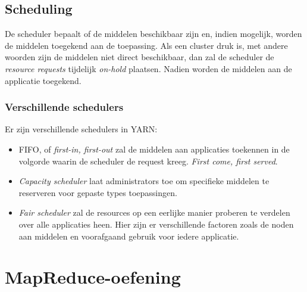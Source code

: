 \documentclass[a4paper,10pt,twoside]{report}
\begin{document}
\subsection{Scheduling}

De scheduler bepaalt of de middelen beschikbaar zijn en, indien mogelijk, worden de middelen toegekend aan de toepassing. Als een cluster druk is, met andere woorden zijn de middelen niet direct beschikbaar, dan zal de scheduler de \textit{resource requests} tijdelijk \textit{on-hold} plaatsen. Nadien worden de middelen aan de applicatie toegekend.

\subsubsection{Verschillende schedulers}

Er zijn verschillende schedulers in YARN:

\begin{itemize}
	\item FIFO, of \textit{first-in, first-out} zal de middelen aan applicaties toekennen in de volgorde waarin de scheduler de request kreeg. \textit{First come, first served}.
	\item \textit{Capacity scheduler} laat administrators toe om specifieke middelen te reserveren voor gepaste types toepassingen. 
	\item \textit{Fair scheduler} zal de resources op een eerlijke manier proberen te verdelen over alle applicaties heen. Hier zijn er verschillende factoren zoals de noden aan middelen en voorafgaand gebruik voor iedere applicatie.
\end{itemize}

\newpage
\section{MapReduce-oefening}
\end{document}
